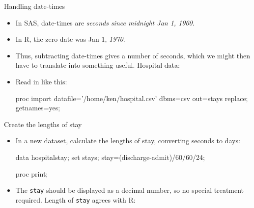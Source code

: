 \documentclass[unknownkeysallowed]{beamer}\usepackage[]{graphicx}\usepackage[]{color}
\begin{document}
\begin{frame}[fragile]{Handling date-times}
  
  \begin{itemize}
  \item In SAS, date-times are \emph{seconds since midnight Jan 1,
      1960}.
  \item In R, the zero date was Jan 1, \emph{1970}.
  \item Thus, subtracting date-times gives a number of seconds, which
    we might then have to translate into something useful. Hospital data:
    
    

    \item Read in like this:
    
    \begin{small}
\begin{Datastep}
proc import
  datafile='/home/ken/hospital.csv'
    dbms=csv
    out=stays
    replace;
  getnames=yes;
\end{Datastep}      
    \end{small}
    
     
    
  \end{itemize}
  
\end{frame}

\begin{frame}[fragile]{Create the lengths of stay}
  
  \begin{itemize}
  \item In a new dataset, calculate the lengths of stay, converting
    seconds to days:
   
    \begin{small}
    \begin{Datastep}
data hospitalstay;
  set stays;
  stay=(discharge-admit)/60/60/24;
    \end{Datastep}
    \end{small}

    \begin{Sascode}[store=dq]
proc print;          
    \end{Sascode}

      \item The \texttt{stay} should be displayed as a
    decimal number, so no special treatment required.
    Length of \texttt{stay} agrees with R:



  \end{itemize}
  
\end{frame}
\end{document}
